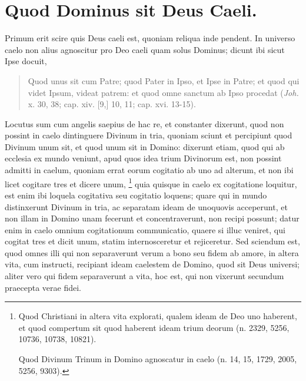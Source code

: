 \chapter{Quod Dominus sit Deus Caeli.}

\begin{topic}{2}
    Primum erit scire quis Deus caeli est, quoniam reliqua inde pendent.
    In universo caelo non alius agnoscitur pro Deo caeli quam solus Dominus; dicunt ibi sicut Ipse docuit,
    \begin{quote}
        Quod unus sit cum Patre; quod Pater in Ipso, et Ipse in Patre; et quod qui videt Ipsum, videat patrem: et quod
        omne sanctum ab Ipso procedat (\emph{Joh.} x. 30, 38; cap. xiv. [9,] 10, 11; cap. xvi. 13-15).
    \end{quote}
    Locutus sum cum angelis saepius de hac re, et constanter dixerunt, quod non possint in caelo dintinguere Divinum in
    tria, quoniam sciunt et percipiunt quod Divinum unum sit, et quod unum sit in Domino: dixerunt etiam, quod qui ab
    ecclesia ex mundo veniunt, apud quos idea trium Divinorum est, non possint admitti in caelum, quoniam errat eorum
    cogitatio ab uno ad alterum, et non ibi licet cogitare tres et dicere unum,
    \footnote{
        Quod Christiani in altera vita explorati, qualem ideam de Deo uno haberent, et quod compertum sit quod haberent
        ideam trium deorum (n. 2329, 5256, 10736, 10738, 10821).

        Quod Divinum Trinum in Domino agnoscatur in caelo (n. 14, 15, 1729, 2005, 5256, 9303).
    }
    quia quisque in caelo ex cogitatione loquitur, est enim ibi loquela cogitativa seu cogitatio loquens; quare qui in
    mundo distinxerunt Divinum in tria, ac separatam ideam de unoquovis acceperunt, et non illam in Domino unam
    fecerunt et concentraverunt, non recipi possunt; datur enim in caelo omnium cogitationum communicatio, quaere si
    illuc veniret, qui cogitat tres et dicit unum, statim internosceretur et rejiceretur.
    Sed sciendum est, quod omnes illi qui non separaverunt verum a bono seu fidem ab amore, in altera vita, cum
    instructi, recipiant ideam caelestem de Domino, quod sit Deus universi; aliter vero qui fidem separaverunt a vita,
    hoc est, qui non vixerunt secundum praecepta verae fidei.
\end{topic}

